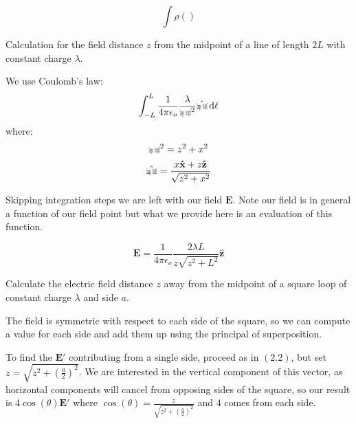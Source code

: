 \documentclass[10pt]{article}
\def\rcurs{{\mbox{$\resizebox{.16in}{.08in}{\texttt{[image: ScriptR]}}$}}}
\def\brcurs{{\mbox{$\resizebox{.16in}{.08in}{\texttt{[image: BoldR]}}$}}}
\def\hrcurs{{\mbox{$\hat \brcurs$}}}
\newcommand{\uvec}[1]{\boldsymbol{\hat{\textbf{#1}}}}
\begin{document}
\begin{definition}
	\[\int \rho() \]
\end{definition}

\begin{example}{2.2}
Calculation for the field distance $z$ from the midpoint of a line of length $2L$ with constant charge $\lambda$.

We use Coulomb's law:
	\[
		\int_{-L}^{L} \frac 1{4\pi\epsilon_o} \frac{\lambda}{\rcurs^2} \hrcurs \dd \ell
	\]
where:
\[ \rcurs^2 = z^2 + x^2\]
\[ \hrcurs = \frac{x\uvec{x} + z\uvec{z}}{\sqrt{z^2 + x^2}} \]
\end{example}
\indent Skipping integration steps we are left with our field $\boldsymbol{E}$. Note our field is in general a function of our field point but what we provide here is an evaluation of this function.

\[
	\boldsymbol{E} = \frac 1{4\pi\epsilon_o} \frac{2\lambda L}{z \sqrt{z^2 + L^2}} \uvec{z}
\]

\begin{exercise}[2.4]
	Calculate the electric field distance $z$ away from the midpoint of a square loop of constant charge $\lambda$ and side $a$.
\end{exercise}

\begin{solution}[2.4]

The field is symmetric with respect to each side of the square, so we can compute a value for each side and add them up using the principal of superposition.

To find the $\boldsymbol{E}'$ contributing from a single side, proceed as in $(2.2)$, but set $z = \sqrt{z^2 + (\frac a2)^2}$. We are interested in the vertical component of this vector, as horizontal components will cancel from opposing sides of the square, so our result is $4\cos(\theta)\boldsymbol{E}'$ where $\cos(\theta) = \frac{z}{\sqrt{z^2 + (\frac a2)^2}}$ and $4$ comes from each side.


\end{solution}
\end{document}
